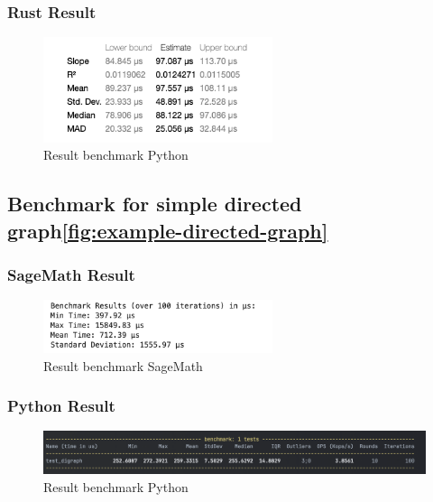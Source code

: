 \subsubsection*{Rust Result}
\begin{figure}[!h]
    \centering
    \includegraphics[width=0.60\textwidth]{images/benchmark/graph_wikipedia/benchmark_graph_wikipedia_rust}
    \caption{Result benchmark Python}
    \label{fig:benchmark-graph-wikipedia-rust}
\end{figure}


\subsection{Benchmark for simple directed graph\ref{fig:example-directed-graph}}\label{subsec:benchmark-for-simple-directed-graph}

\subsubsection*{SageMath Result}
\begin{figure}[!h]
    \centering
    \includegraphics[width=0.60\textwidth]{images/benchmark/digraph/benchmark_digraph_sagemath}
    \caption{Result benchmark SageMath}
    \label{fig:benchmark-digraph-sagemath}
\end{figure}

\subsubsection*{Python Result}
\begin{figure}[!h]
    \centering
    \includegraphics[width=1\textwidth]{images/benchmark/digraph/benchmark_digraph_python}
    \caption{Result benchmark Python}
    \label{fig:benchmark-digraph-python}
\end{figure}

